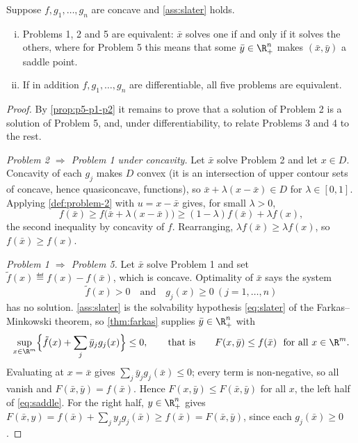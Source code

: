 \begin{theorem}\label{thm:kuhn-tucker}
	Suppose $f,g_1,\dots,g_n$ are concave and \autoref{ass:slater} holds.
	\begin{enumerate}[(i)]
		\item Problems 1, 2 and 5 are equivalent: $\bar x$ solves one if and only if it
		      solves the others, where for Problem 5 this means that some
		      $\bar y\in\R^n_+$ makes $(\bar x,\bar y)$ a saddle point.
		\item If in addition $f,g_1,\dots,g_n$ are differentiable, all five problems
		      are equivalent.
	\end{enumerate}
\end{theorem}

\begin{proof}
	By \autoref{prop:p5-p1-p2} it remains to prove that a solution of Problem 2 is a
	solution of Problem 5, and, under differentiability, to relate Problems 3 and 4
	to the rest.

	\emph{Problem 2 $\Rightarrow$ Problem 1 under concavity.} Let $\bar x$ solve
	Problem 2 and let $x\in D$. Concavity of each $g_j$ makes $D$ convex
	(it is an intersection of upper contour sets of concave, hence quasiconcave,
	functions), so $\bar x+\lambda(x-\bar x)\in D$ for $\lambda\in[0,1]$. Applying
	\autoref{def:problem-2} with $u=x-\bar x$ gives, for small $\lambda>0$,
	\[
		f(\bar x)\geq f\bigl(\bar x+\lambda(x-\bar x)\bigr)
		\geq(1-\lambda)f(\bar x)+\lambda f(x),
	\]
	the second inequality by concavity of $f$. Rearranging,
	$\lambda f(\bar x)\geq\lambda f(x)$, so $f(\bar x)\geq f(x)$.

	\emph{Problem 1 $\Rightarrow$ Problem 5.} Let $\bar x$ solve Problem 1 and set
	$\tilde f(x)\eqdef f(x)-f(\bar x)$, which is concave. Optimality of $\bar x$
	says the system
	\[
		\tilde f(x)>0\quad\text{and}\quad g_j(x)\geq0\ (j=1,\dots,n)
	\]
	has no solution. \autoref{ass:slater} is the solvability hypothesis
	\eqref{eq:slater} of the Farkas--Minkowski theorem, so
	\autoref{thm:farkas} supplies $\bar y\in\R^n_+$ with
	\[
		\sup_{x\in\R^m}\Bigl\{\tilde f(x)+\sum_j\bar y_jg_j(x)\Bigr\}\leq0,
		\qquad\text{that is}\qquad
		F(x,\bar y)\leq f(\bar x)\ \text{ for all }x\in\R^m .
	\]
	Evaluating at $x=\bar x$ gives $\sum_j\bar y_jg_j(\bar x)\leq0$; every term is
	non-negative, so all vanish and $F(\bar x,\bar y)=f(\bar x)$. Hence
	$F(x,\bar y)\leq F(\bar x,\bar y)$ for all $x$, the left half of
	\eqref{eq:saddle}. For the right half, $y\in\R^n_+$ gives
	$F(\bar x,y)=f(\bar x)+\sum_jy_jg_j(\bar x)\geq f(\bar x)=F(\bar x,\bar y)$,
	since each $g_j(\bar x)\geq0$.


\end{proof}
